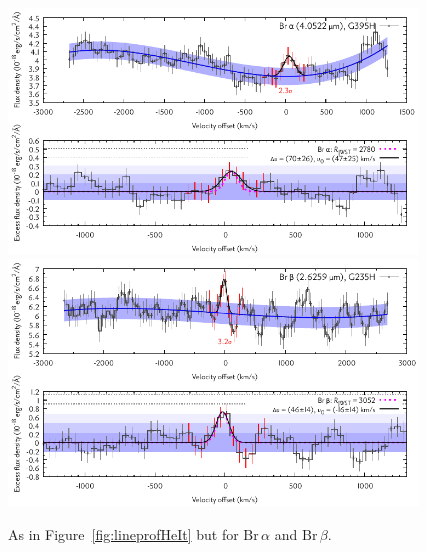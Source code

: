 \documentclass[twocolumn,twocolumnappendix]{aastex631}
\def\Bra{\ensuremath{\mathrm{Br}\,\alpha}\xspace}           %
\def\Brb{\ensuremath{\mathrm{Br}\,\beta}\xspace}            %
\begin{document}
\begin{figure}
 \centering
 \includegraphics[width=0.97\textwidth]{TWA27b_g395h-f290lp_blauw_sigkorr_Bra_Dv2700_ohni300_Abb_simul.pdf}
 \includegraphics[width=0.97\textwidth]{TWA27b_g235h-f170lp_rood_sigkorr_Brb_Dv2700_ohni300_Abb_simul.pdf}
\caption{%
As in Figure~\ref{fig:lineprofHeIt} but for \Bra and \Brb.
}
\label{fig:lineprofBraBrb}
\end{figure}
\end{document}
